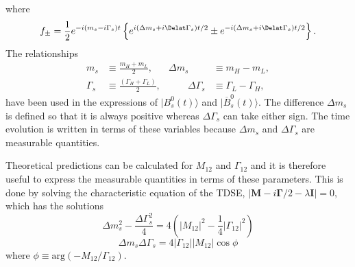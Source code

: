 {%
where 
\begin{equation}
f_{\pm} = \frac{1}{2} e^{-i(m_s - i\Gamma_s)t} \left \{ e^{i(\Delta m_s + i \Delat\Gamma_s)t/2} \pm e^{-i(\Delta m_s + i \Delat\Gamma_s)t/2} \right \}.
\end{equation}
The relationships
\begin{align}
m_s &\equiv \frac{m_H + m_L}{2}, &  \Delta m_s &\equiv m_H - m_L,\\
\Gamma_s &\equiv \frac{(\Gamma_H + \Gamma_L)}{2}, & \qquad \Delta \Gamma_s &\equiv \Gamma_L - \Gamma_H,
\label{eq:deltas}
\end{align}
have been used in the expressions of $|B^{0}_{s}(t)\rangle$ and $|\overline{B}^{0}_{s} (t) \rangle$. The difference $\Delta m_s$ is defined so that it is always positive whereas $\Delta\Gamma_s$ can take either sign. The time evolution is written in terms of these variables because $\Delta m_s$ and $\Delta\Gamma_s$ are measurable quantities.

Theoretical predictions can be calculated for $M_{12}$ and $\Gamma_{12}$ and it is therefore useful to express the measurable quantities in terms of these parameters. This is done by solving the characteristic equation of the TDSE, $|\mathbf{M} - i \mathbf{\Gamma}/2 - \lambda \mathbf{I}| = 0$, which has the solutions
\begin{equation}
\Delta m_{s}^2 - \frac{\Delta\Gamma_{s}^2}{4} = 4(|M_{12}|^2 - \frac{1}{4} |\Gamma_{12}|^2) 
\end{equation}
\begin{equation}
\Delta m_{s} \Delta \Gamma_{s} = 4 |\Gamma_{12}| |M_{12}| \cos \phi
\end{equation}
where $\phi \equiv \mathrm{arg}(-M_{12}/\Gamma_{12})$.

}
